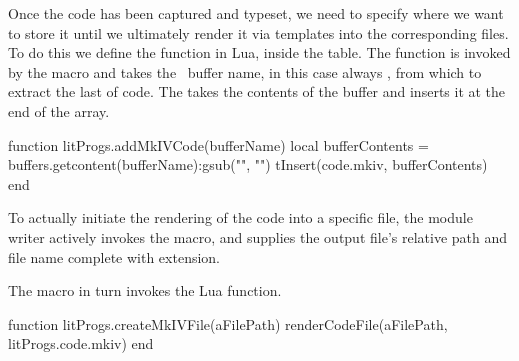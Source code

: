 \let\oldStopMkIVAltCode=\stopMkIVAltCode
\def\stopMkIVAltCode{%
  \oldStopMkIVAltCode%
  \directlua{thirddata.literateProgs.addMkIVCode('_typing_')}}

\stopMkIVCode

 Once the  code has been captured and typeset, we need to 
specify where we want to store it until we ultimately render it via 
templates into the corresponding  files. To do this we define 
the  function in Lua, inside the  table. 
The  function is invoked by the \type{\stopMkIVCode} 
macro and takes the \ConTeXt\ buffer name, in this case always 
, from which to extract the last  of 
 code. The  takes the contents of the buffer 
and inserts it at the end of the  array. 

\startLuaCode
function litProgs.addMkIVCode(bufferName)
  local bufferContents = buffers.getcontent(bufferName):gsub("", "\n")
  tInsert(code.mkiv, bufferContents)
end
\stopLuaCode

 
To actually initiate the rendering of the  code into a specific 
file, the module writer actively invokes the \type{\createMkIVFile} macro, 
and supplies the output file's relative path and file name complete with 
extension. 

\startMkIVCode


\def\createMkIVFile[#1]{
  \directlua{thirddata.literateProgs.createMkIVFile('#1')}
}

\stopMkIVCode

The \type{\createMkIVFile} macro in turn invokes the  
Lua function. 

\startLuaCode
function litProgs.createMkIVFile(aFilePath)
  renderCodeFile(aFilePath, litProgs.code.mkiv)
end
\stopLuaCode

\stopchapter